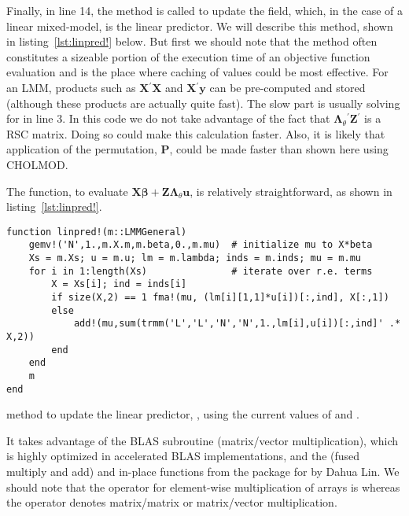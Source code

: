 \documentclass{jss}
\newcommand{\bLt}{\ensuremath{\bm\Lambda_\theta}}
\newcommand{\trans}{\ensuremath{^\prime}}
\begin{document}
Finally, in line 14, the  method is called to update
the  field, which, in the case of a linear mixed-model, is the
linear predictor. We will describe this method, shown in
listing~\ref{lst:linpred!} below.   But first we should note that the
 method often constitutes a sizeable portion of the
execution time of an objective function evaluation and is the place
where caching of values could be most effective.  For an LMM, products
such as $\bm X\trans\bm X$ and $\bm X\trans\bm y$ can be pre-computed and stored (although
these products are actually quite fast).  The slow part is usually
solving for  in line 3.  In this code we do not take
advantage of the fact that $\bLt\trans\bm Z\trans$ is a RSC matrix.
Doing so could make this calculation faster.  Also, it is likely that
application of the permutation, $\bm P$, could be made faster than
shown here using CHOLMOD.

The  function, to evaluate $\bm X\bm\beta + \bm
Z\bLt\bm u$, is relatively straightforward, as shown in
listing~\ref{lst:linpred!}.
\begin{listing}[tbp]
  \begin{verbatim}
function linpred!(m::LMMGeneral)
    gemv!('N',1.,m.X.m,m.beta,0.,m.mu)  # initialize mu to X*beta
    Xs = m.Xs; u = m.u; lm = m.lambda; inds = m.inds; mu = m.mu
    for i in 1:length(Xs)               # iterate over r.e. terms
        X = Xs[i]; ind = inds[i]
        if size(X,2) == 1 fma!(mu, (lm[i][1,1]*u[i])[:,ind], X[:,1])
        else
            add!(mu,sum(trmm('L','L','N','N',1.,lm[i],u[i])[:,ind]' .* X,2))
        end
    end
    m
end
  \end{verbatim}
  \caption{ method to update the linear predictor,
    , using the current values of  and .}
  \label{lst:linpred!}
\end{listing}
It takes advantage of the BLAS subroutine  (matrix/vector
multiplication), which is highly optimized in accelerated BLAS
implementations, and the   (fused multiply and add) and
in-place   functions from the 
package for  by Dahua Lin.  We should note that the
 operator for element-wise multiplication of arrays is
 whereas the \code{*} operator denotes matrix/matrix or
matrix/vector multiplication.
\end{document}
